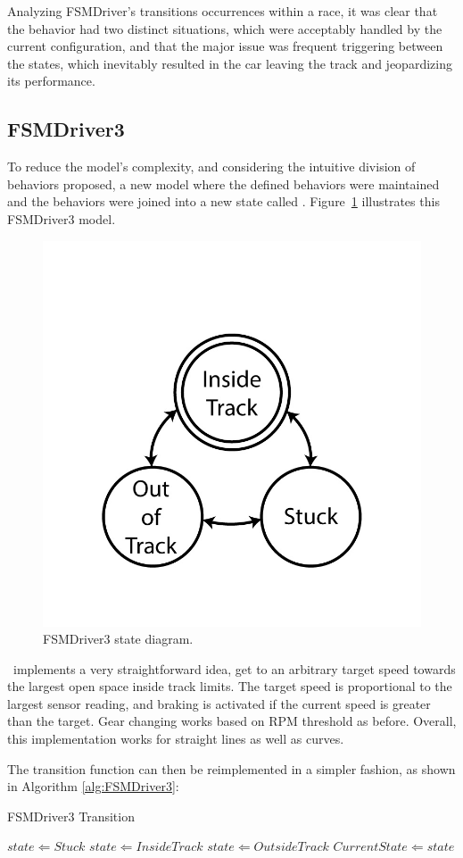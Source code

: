 Analyzing FSMDriver's transitions occurrences within a race, it was clear that the  behavior had two distinct situations, which were acceptably handled by the current configuration, and that the major issue was frequent triggering between the  states, which inevitably resulted in the car leaving the track and jeopardizing its performance.

\subsection{FSMDriver3}%
To reduce the model's complexity, and considering the intuitive division of behaviors proposed, a new model where the defined  behaviors were maintained and the  behaviors were joined into a new state called \IT. Figure~\ref{Fig:FSM3Diagram} illustrates this FSMDriver3 model.

\begin{figure}[h]
	\centering
	\includegraphics[width=.45\textwidth]{ThreeStateFSM}
	\caption{FSMDriver3 state diagram.}
	\label{Fig:FSM3Diagram}
\end{figure}

\IT~implements a very straightforward idea, get to an arbitrary target speed towards the largest open space inside track limits. The target speed is proportional to the largest sensor reading, and braking is activated if the current speed is greater than the target. Gear changing works based on RPM threshold as before. Overall, this implementation works for straight lines as well as curves.

%

The transition function can then be reimplemented in a simpler fashion, as shown in Algorithm \ref{alg:FSMDriver3}:

\begin{algorithm}[h]%
\caption{FSMDriver3 Transition}%
\label{alg:FSMDriver3}%
\begin{algorithmic}
        \STATE $state \Leftarrow Stuck$
    \ELSE
            \STATE $state \Leftarrow Inside Track$
        \ELSE
            \STATE $state \Leftarrow Outside Track$
        \ENDIF
    \ENDIF
        \STATE $Current State \Leftarrow state$
    \ENDIF
\end{algorithmic}
\end{algorithm}

